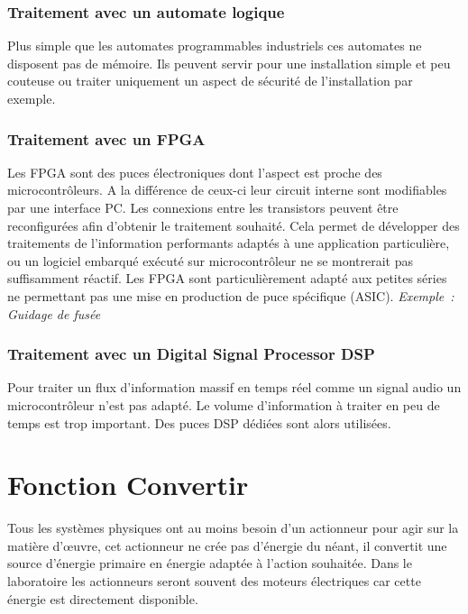 \documentclass[
]{article}
\begin{document}
\hypertarget{traitement-avec-un-automate-logique}{%
\subsubsection{Traitement avec un automate
logique}\label{traitement-avec-un-automate-logique}}

Plus simple que les automates programmables industriels ces automates ne
disposent pas de mémoire. Ils peuvent servir pour une installation
simple et peu couteuse ou traiter uniquement un aspect de sécurité de
l'installation par exemple.

\hypertarget{traitement-avec-un-fpga}{%
\subsubsection{Traitement avec un FPGA}\label{traitement-avec-un-fpga}}

Les FPGA sont des puces électroniques dont l'aspect est proche des
microcontrôleurs. A la différence de ceux-ci leur circuit interne sont
modifiables par une interface PC. Les connexions entre les transistors
peuvent être reconfigurées afin d'obtenir le traitement souhaité. Cela
permet de développer des traitements de l'information performants
adaptés à une application particulière, ou un logiciel embarqué exécuté
sur microcontrôleur ne se montrerait pas suffisamment réactif. Les FPGA
sont particulièrement adapté aux petites séries ne permettant pas une
mise en production de puce spécifique (ASIC). \emph{Exemple~: Guidage de
fusée}

\hypertarget{traitement-avec-un-digital-signal-processor-dsp}{%
\subsubsection{Traitement avec un Digital Signal Processor
DSP}\label{traitement-avec-un-digital-signal-processor-dsp}}

Pour traiter un flux d'information massif en temps réel comme un signal
audio un microcontrôleur n'est pas adapté. Le volume d'information à
traiter en peu de temps est trop important. Des puces DSP dédiées sont
alors utilisées.

\hypertarget{fonction-convertir}{%
\section{Fonction Convertir}\label{fonction-convertir}}

Tous les systèmes physiques ont au moins besoin d'un actionneur pour
agir sur la matière d'œuvre, cet actionneur ne crée pas d'énergie du
néant, il convertit une source d'énergie primaire en énergie adaptée à
l'action souhaitée. Dans le laboratoire les actionneurs seront souvent
des moteurs électriques car cette énergie est directement disponible.
\end{document}
